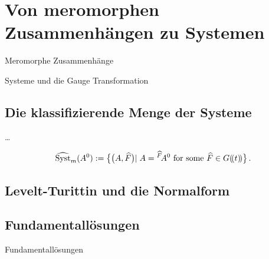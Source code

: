 \section{Von meromorphen Zusammenhängen zu Systemen}
\begin{frame}[t]{Meromorphe Zusammenhänge}
  \begin{defn}
  \end{defn}
  \begin{defn}[Zusammenhangsmatrix]
  \end{defn}
\end{frame}
\begin{frame}[t]{Systeme und die Gauge Transformation}
\end{frame}

\subsection{Die klassifizierende Menge der Systeme}
\begin{frame}[t]{\dots}
  \begin{defn}
  \end{defn}
  \begin{defn}
  \end{defn}
  \[
    \widehat{\operatorname{Syst}}_m(A^0):=\bigl\{\bigl(A,\widehat F\bigl)
    \mid A={}^{\widehat F}\!A^0 \text{ for some } \widehat F\in G(\!(t)\!)\bigl\} \,.
  \]
\end{frame}

\subsection{Levelt-Turittin und die Normalform}

\subsection{Fundamentallösungen}
\begin{frame}[t]{Fundamentallösungen}
\end{frame}

